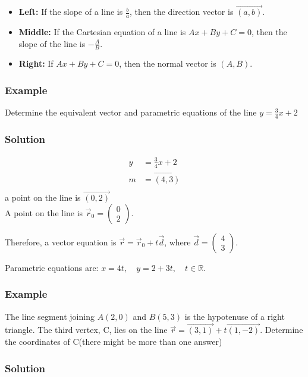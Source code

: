 \documentclass{article}
\begin{document}
\begin{itemize}
    \item \textbf{Left:} If the slope of a line is $\frac{b}{a}$, then the direction vector is $\overrightarrow{(a,b)}$.
    \item \textbf{Middle:} If the Cartesian equation of a line is $Ax + By + C = 0$, then the slope of the line is $-\frac{A}{B}$.
    \item \textbf{Right:} If $Ax + By + C = 0$, then the normal vector is $(A,B)$.
\end{itemize}
\subsubsection*{Example}
Determine the equivalent vector and parametric equations of the line $y=\frac{3}{4}x+2$
\subsubsection*{Solution}
\begin{align*}
    y&=\frac{3}{4}x+2\\
    m&=\overrightarrow{(4,3)}\\
\end{align*}
a point on the line is $\overrightarrow{(0,2)}$\\
A point on the line is $\vec{r}_0 = \begin{pmatrix} 0 \\ 2 \end{pmatrix}$.

Therefore, a vector equation is $\vec{r} = \vec{r}_0 + t \vec{d}$, where $\vec{d} = \begin{pmatrix} 4 \\ 3 \end{pmatrix}$.

Parametric equations are:
$ x = 4t, \quad y = 2 + 3t, \quad t \in \mathbb{R}.$
\subsubsection*{Example }
The line segment joining $A(2,0)$ and $B(5,3)$ is the hypotenuse of a right triangle. The third vertex, C, lies on the line $\vec{r}=\overrightarrow{(3,1)}+t\overrightarrow{(1,-2)}$. Determine the coordinates of C(there might be more than one answer)

\subsubsection*{Solution}
\end{document}

